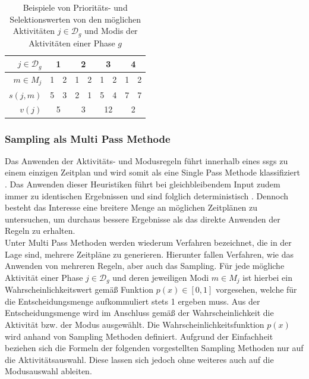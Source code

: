 \begin{table}[H]
\centering

\begin{tabular}{r|cc|cc|cc|cc}
$j \in \mathcal{D}_g$  & \multicolumn{2}{c|}{1} & \multicolumn{2}{c|}{2} & \multicolumn{2}{c|}{3} & \multicolumn{2}{c}{4} \\ \hline
$m \in M_j$ & \multicolumn{1}{c|}{1} & 2 & \multicolumn{1}{c|}{1} & 2 & \multicolumn{1}{c|}{1} & 2 & \multicolumn{1}{c|}{1} & 2 \\ \hline
$s(j, m)$                 & \multicolumn{1}{c|}{5} & 3 & \multicolumn{1}{c|}{2} & 1 & \multicolumn{1}{c|}{5} & 4 & \multicolumn{1}{c|}{7} & 7 \\ \hline
$v(j)$                      & \multicolumn{2}{c|}{5} & \multicolumn{2}{c|}{3} & \multicolumn{2}{c|}{12} & \multicolumn{2}{c}{2} 
\end{tabular}%

\caption{Beispiele von Prioritäts- und Selektionswerten von den möglichen Aktivitäten $j \in \mathcal{D}_g$ und Modis der Aktivitäten einer Phase $g$}
\label{tab:ModesRulesExample}
\end{table}

\subsubsection{Sampling als Multi Pass Methode} \label{subsec:SGS_RBBRS}

Das Anwenden der Aktivitäts- und Modusregeln führt innerhalb eines \ac{ssgs} zu einem einzigen Zeitplan und wird somit als eine Single Pass Methode klassifiziert \cite[vgl.][S. 6]{kolisch_heuristic_1998}. Das Anwenden dieser Heuristiken führt bei gleichbleibendem Input zudem immer zu identischen Ergebnissen und sind folglich deterministisch \cite[vgl.][S. 4]{schirmer_parameterized_1997}. Dennoch besteht das Interesse eine breitere Menge an möglichen Zeitplänen zu untersuchen, um durchaus bessere Ergebnisse als das direkte Anwenden der Regeln zu erhalten.\\

Unter Multi Pass Methoden werden wiederum Verfahren bezeichnet, die in der Lage sind, mehrere Zeitpläne zu generieren. Hierunter fallen Verfahren, wie das Anwenden von mehreren Regeln, aber auch das Sampling. Für jede mögliche Aktivität einer Phase $j \in \mathcal{D}_g$ und deren jeweiligen Modi $m \in M_j$ ist hierbei ein Wahrscheinlichkeitswert gemäß Funktion $p(x) \in [0, 1]$ vorgesehen, welche für die Entscheidungsmenge aufkommuliert stets 1 ergeben muss. Aus der Entscheidungsmenge wird im Anschluss gemäß der Wahrscheinlichkeit die Aktivität bzw. der Modus ausgewählt. Die Wahrscheinlichkeitsfunktion $p(x)$ wird anhand von Sampling Methoden definiert. \cite[vgl.][S. 7 f.]{kolisch_heuristic_1998} Aufgrund der Einfachheit beziehen sich die Formeln der folgenden vorgestellten Sampling Methoden nur auf die Aktivitätsauswahl. Diese lassen sich jedoch ohne weiteres auch auf die Modusauswahl ableiten. \\

